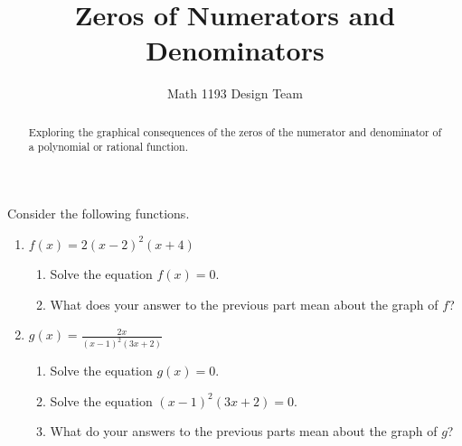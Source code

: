 \documentclass[noauthor]{ximera}
\title{Zeros of Numerators and Denominators}
\author{Math 1193 Design Team}
\begin{document}
\begin{abstract}
    Exploring the graphical consequences of the zeros of the numerator and denominator of a polynomial or rational function.
\end{abstract}
\maketitle

Consider the following functions.

\begin{enumerate}
    \item \(f(x) = 2(x - 2)^2(x + 4)\)
    \begin{enumerate}
        \item Solve the equation \(f(x) = 0\).
        \item What does your answer to the previous part mean about the graph of \(f\)?
    \end{enumerate}
    \item \(g(x) = \frac{2x}{(x - 1)^2(3x + 2)}\)
    \begin{enumerate}
        \item Solve the equation \(g(x) = 0\).
        \item Solve the equation \((x - 1)^2(3x + 2) = 0\).
        \item What do your answers to the previous parts mean about the graph of \(g\)?
    \end{enumerate}
\end{enumerate}
\end{document}
